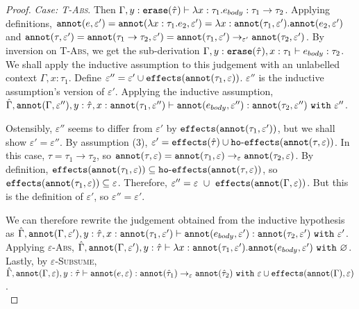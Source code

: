\begin{appendix}
\begin{proof}
\textit{Case: \textsc{T-Abs}}. Then $\Gamma, y: \mathtt{erase}(\hat \tau) \vdash \lambda x: \tau_1.e_{body}: \tau_1 \rightarrow \tau_2$. Applying definitions, $\mathtt{annot}(e, \varepsilon') = \mathtt{annot}(\lambda x: \tau_1.e_2, \varepsilon') = \lambda x: \mathtt{annot}(\tau_1, \varepsilon').\mathtt{annot}(e_2, \varepsilon')$ and $\mathtt{annot}(\tau, \varepsilon') = \mathtt{annot}(\tau_1 \rightarrow \tau_2, \varepsilon') = \mathtt{annot}(\tau_1, \varepsilon') \rightarrow_{\varepsilon'} \mathtt{annot}(\tau_2, \varepsilon')$. By inversion on \textsc{T-Abs}, we get the sub-derivation $\Gamma, y: \mathtt{erase}(\hat \tau), x: \tau_1 \vdash e_{body}: \tau_2$. We shall apply the inductive assumption to this judgement with an unlabelled context $\Gamma, x: \tau_1$. Define $\varepsilon'' = \varepsilon' \cup \mathtt{effects}(\mathtt{annot}(\tau_1, \varepsilon))$. $\varepsilon''$ is the inductive assumption's version of $\varepsilon'$. Applying the inductive assumption, $\hat \Gamma, \mathtt{annot}(\Gamma, \varepsilon''), y: \hat \tau, x: \mathtt{annot}(\tau_1, \varepsilon'') \vdash \mathtt{annot}(e_{body}, \varepsilon''): \mathtt{annot}(\tau_2, \varepsilon'')~\mathtt{with}~ \varepsilon''$.

Ostensibly, $\varepsilon''$ seems to differ from $\varepsilon'$ by $\mathtt{effects}(\mathtt{annot}(\tau_1, \varepsilon'))$, but we shall show $\varepsilon' = \varepsilon''$. By assumption (3), $\varepsilon' = \mathtt{effects}(\hat \tau) \cup \mathtt{ho \hbox{-} effects}(\mathtt{annot}(\tau, \varepsilon))$. In this case, $\tau = \tau_1 \rightarrow \tau_2$, so $\mathtt{annot}(\tau, \varepsilon) = \mathtt{annot}(\tau_1, \varepsilon) \rightarrow_{\varepsilon} \mathtt{annot}(\tau_2, \varepsilon)$. By definition, $\mathtt{effects}(\mathtt{annot}(\tau_1, \varepsilon)) \subseteq \mathtt{ho \hbox{-} effects}(\mathtt{annot}(\tau, \varepsilon))$, so $\mathtt{effects}(\mathtt{annot}(\tau_1, \varepsilon)) \subseteq \varepsilon$. Therefore, $\varepsilon'' = \varepsilon~\cup~ \mathtt{effects}(\mathtt{annot}(\Gamma, \varepsilon))$. But this is the definition of $\varepsilon'$, so $\varepsilon'' = \varepsilon'$.

We can therefore rewrite the judgement obtained from the inductive hypothesis as $\hat \Gamma, \mathtt{annot}(\Gamma, \varepsilon'), y: \hat \tau, x: \mathtt{annot}(\tau_1, \varepsilon') \vdash \mathtt{annot}(e_{body}, \varepsilon'): \mathtt{annot}(\tau_2, \varepsilon')~\mathtt{with}~ \varepsilon'$. Applying \textsc{$\varepsilon$-Abs}, $\hat \Gamma, \mathtt{annot}(\Gamma, \varepsilon'), y: \hat \tau \vdash \lambda x: \mathtt{annot}(\tau_1, \varepsilon'). \mathtt{annot}(e_{body}, \varepsilon')~\mathtt{with}~ \varnothing$. Lastly, by \textsc{$\varepsilon$-Subsume}, $\hat \Gamma, \mathtt{annot}(\Gamma, \varepsilon), y: \hat \tau \vdash \mathtt{annot}(e, \varepsilon) : \mathtt{annot}(\hat \tau_1) \rightarrow_{\varepsilon} \mathtt{annot}(\hat \tau_2)~\mathtt{with}~ \varepsilon \cup \mathtt{effects}(\mathtt{annot}(\Gamma), \varepsilon)$.\\


\end{proof}
\end{appendix}
